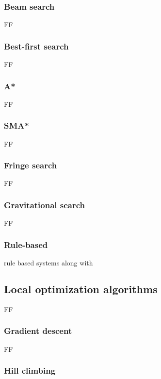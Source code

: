 \subsubsection{Beam search}

FF


\subsubsection{Best-first search}

FF


\subsubsection{A*}

FF


\subsubsection{SMA*}

FF


\subsubsection{Fringe search}

FF


\subsubsection{Gravitational search}

FF


\subsubsection{Rule-based}

rule based systems \cite{Smith2011} along with



\subsection{Local optimization algorithms}

FF


\subsubsection{Gradient descent}

FF


\subsubsection{Hill climbing}

